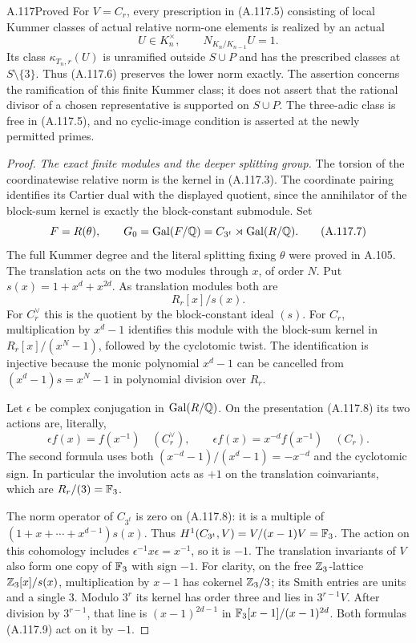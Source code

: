 \begin{statement}{A.117}{Proved}
For \(V=C_r\), every prescription in (A.117.5) consisting of
local Kummer classes of actual relative norm-one elements is
realized by an actual
\[
 U\in K_n^\times,\qquad N_{K_n/K_{n-1}}U=1.
 \tag{A.117.6}
\]
Its class \(\kappa_{T_n,r}(U)\) is unramified outside
\(S\cup P\) and has the prescribed classes at \(S\setminus\{3\}\).
Thus (A.117.6) preserves the lower norm exactly.
The assertion concerns the ramification of this finite Kummer
class; it does not assert that the rational divisor of a chosen
representative is supported on \(S\cup P\).
The three-adic class is free in (A.117.5), and no cyclic-image
condition is asserted at the newly permitted primes.
\end{statement}

\begin{proof}
\emph{The exact finite modules and the deeper splitting group.}
The torsion of the coordinatewise relative norm is the kernel
in (A.117.3).  The coordinate pairing identifies its Cartier
dual with the displayed quotient, since the annihilator of
the block-sum kernel is exactly the block-constant submodule.
Set
\[
 F=R(\theta),\qquad
 G_0=\operatorname{Gal}(F/\mathbb Q)
       =C_{3^t}\rtimes\operatorname{Gal}(R/\mathbb Q).
 \tag{A.117.7}
\]
The full Kummer degree and the literal splitting fixing
\(\theta\) were proved in A.105.  The translation acts on
the two modules through \(x\), of order \(N\).
Put \(s(x)=1+x^d+x^{2d}\).
As translation modules both are
\[
                         R_r[x]/s(x).
 \tag{A.117.8}
\]
For \(C_r^\vee\) this is the quotient by the block-constant
ideal \((s)\).  For \(C_r\), multiplication by \(x^d-1\)
identifies this module with the block-sum kernel in
\(R_r[x]/(x^N-1)\), followed by the cyclotomic twist.
The identification is injective because the monic polynomial
\(x^d-1\) can be cancelled from
\((x^d-1)s=x^N-1\) in polynomial division over \(R_r\).

Let \(\epsilon\) be complex conjugation in
\(\operatorname{Gal}(R/\mathbb Q)\).  On the presentation (A.117.8)
its two actions are, literally,
\[
 \epsilon f(x)=f(x^{-1})\quad(C_r^\vee),\qquad
 \epsilon f(x)=x^{-d}f(x^{-1})\quad(C_r).
 \tag{A.117.9}
\]
The second formula uses both
\((x^{-d}-1)/(x^d-1)=-x^{-d}\) and the cyclotomic sign.
In particular the involution acts as \(+1\) on the
translation coinvariants, which are \(R_r/(3)=\mathbb F_3\).

The norm operator of \(C_{3^t}\) is zero on (A.117.8):
it is a multiple of
\((1+x+\cdots+x^{d-1})s(x)\).
Thus \(H^1(C_{3^t},V)=V/(x-1)V=\mathbb F_3\).
The action on this cohomology includes
\(\epsilon^{-1}x\epsilon=x^{-1}\), so it is \(-1\).
The translation invariants of \(V\) also form one copy
of \(\mathbb F_3\) with sign \(-1\).
For clarity, on the free \(\mathbb Z_3\)-lattice
\(\mathbb Z_3[x]/s(x)\), multiplication by \(x-1\) has
cokernel \(\mathbb Z_3/3\); its Smith entries are units and a
single \(3\).  Modulo \(3^r\) its kernel has order three
and lies in \(3^{r-1}V\).
After division by \(3^{r-1}\), that line is
\((x-1)^{2d-1}\) in
\(\mathbb F_3[x-1]/(x-1)^{2d}\).
Both formulas (A.117.9) act on it by \(-1\).


\end{proof}
